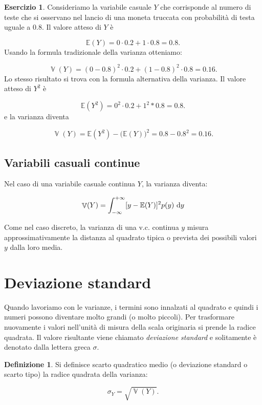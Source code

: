 \documentclass[
  11pt,
]{krantz}
\newcommand{\E}{\mathbb{E}} %
\DeclareMathOperator{\Var}{\mathbb{V}} %
\theoremstyle{definition}
\newtheorem{definition}{Definizione}[chapter]
\theoremstyle{definition}
\theoremstyle{definition}
\newtheorem{exercise}{Esercizio}[chapter]
\theoremstyle{definition}
\theoremstyle{remark}
\begin{document}
\begin{exercise}
Consideriamo la variabile casuale \(Y\) che corrisponde al numero di teste che si osservano nel lancio di una moneta truccata con probabilità di testa uguale a 0.8. Il valore atteso di \(Y\) è

\[
\E(Y) = 0 \cdot 0.2 + 1 \cdot 0.8 = 0.8.
\] Usando la formula tradizionale della varianza otteniamo:

\[
\Var(Y) = (0 - 0.8)^2 \cdot 0.2 + (1 - 0.8)^2 \cdot 0.8 = 0.16.
\] Lo stesso risultato si trova con la formula alternativa della varianza. Il valore atteso di \(Y^2\) è

\[
\E(Y^2) = 0^2 \cdot 0.2 + 1^2 * 0.8 = 0.8.
\] e la varianza diventa

\[
\Var(Y) = \E(Y^2) - \big(\E(Y) \big)^2 = 0.8 - 0.8^2 = 0.16.
\]
\end{exercise}

\hypertarget{variabili-casuali-continue-1}{%
\subsection{Variabili casuali continue}\label{variabili-casuali-continue-1}}

Nel caso di una variabile casuale continua \(Y\), la varianza diventa:

\begin{equation}
\Var(Y) = \int_{-\infty}^{+\infty} \large[y - \E(Y)\large]^2 p(y) \,\operatorname {d}\!y
\label{eq:def-var-rv-cont}
\end{equation}

Come nel caso discreto, la varianza di una v.c. continua \(y\) misura approssimativamente la distanza al quadrato tipica o prevista dei possibili valori \(y\) dalla loro media.

\hypertarget{deviazione-standard}{%
\section{Deviazione standard}\label{deviazione-standard}}

Quando lavoriamo con le varianze, i termini sono innalzati al quadrato e quindi i numeri possono diventare molto grandi (o molto piccoli). Per trasformare nuovamente i valori nell'unità di misura della scala originaria si prende la radice quadrata. Il valore risultante viene chiamato \emph{deviazione standard} e solitamente è denotato dalla lettera greca \(\sigma\).

\begin{definition}
Si definisce scarto quadratico medio (o deviazione standard o scarto tipo) la radice quadrata della varianza:

\begin{equation}
\sigma_Y = \sqrt{\Var(Y)}.
\label{eq:def-sd}
\end{equation}
\end{definition}
\end{document}

